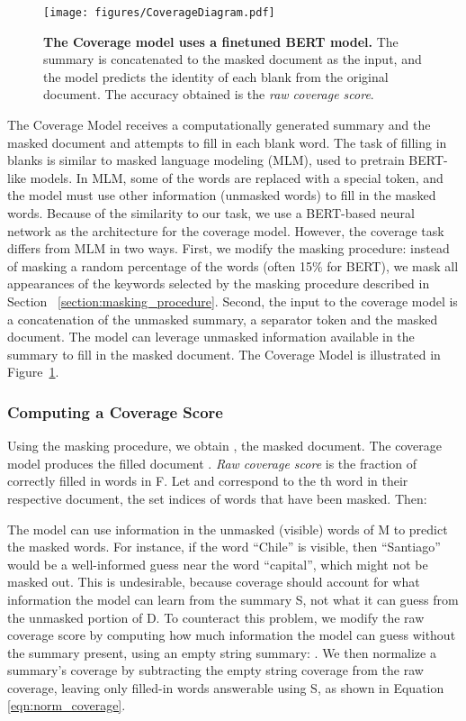 \documentclass[11pt,a4paper]{article}
\begin{document}
\begin{figure}
    \centering
    \texttt{[image: figures/CoverageDiagram.pdf]}
    \caption{\textbf{The Coverage model uses a finetuned BERT model.} The summary is concatenated to the masked document as the input, and the model predicts the identity of each blank from the original document. The accuracy obtained is the \textit{raw coverage score}.}
    \label{fig:coverage_diagram}
\end{figure}

The Coverage Model receives a computationally generated summary and the masked document and attempts to fill in each blank word. The task of filling in blanks is similar to masked language modeling (MLM), used to pretrain BERT-like \cite{devlin2019bert} models. In MLM, some of the words are replaced with a special  token, and the model must use other information (unmasked words) to fill in the masked words.
Because of the similarity to our task, we use a BERT-based neural network as the architecture for the coverage model. However, the coverage task differs from MLM in two ways. First, we modify the masking procedure: instead of masking a random percentage of the words (often 15\% for BERT), we mask all appearances of the keywords selected by the masking procedure described in Section~ \ref{section:masking_procedure}. Second, the input to the coverage model is a concatenation of the unmasked summary, a separator token and the masked document. The model can leverage unmasked information available in the summary to fill in the masked document. The Coverage Model is illustrated in Figure~\ref{fig:coverage_diagram}.

\subsubsection{Computing a Coverage Score}

Using the masking procedure, we obtain , the masked document. The coverage model produces the filled document . \textit{Raw coverage score} is the fraction of correctly filled in words in F. Let  and  correspond to the th word in their respective document,  the set indices of words that have been masked. Then:


The model can use information in the unmasked (visible) words of M to predict the masked words.  For instance, if the word ``Chile'' is visible, then ``Santiago'' would be a well-informed guess near the word ``capital'', which might not be masked out. This is undesirable, because coverage should account for what information the model can learn from the summary S, not what it can guess from the unmasked portion of D. To counteract this problem, we modify the raw coverage score by computing how much information the model can guess without the summary present, using an empty string summary: . We then normalize a summary's coverage by subtracting the empty string coverage from the raw coverage, leaving only filled-in words answerable using S, as shown in Equation \ref{eqn:norm_coverage}.
\end{document}
